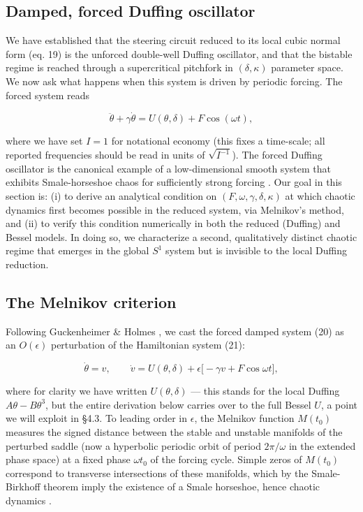 \documentclass[11pt]{article}
\begin{document}
\subsection{Damped, forced Duffing oscillator}

We have established that the steering circuit reduced to its local cubic normal form (eq. 19) is the unforced double-well Duffing oscillator, and that the bistable regime is reached through a supercritical pitchfork in $(\delta, \kappa)$ parameter space. We now ask what happens when this system is driven by periodic forcing. The forced system reads

\begin{equation}
\ddot\theta + \gamma\dot\theta = U(\theta, \delta) + F\cos(\omega t),
\end{equation}

where we have set $I = 1$ for notational economy (this fixes a time-scale; all reported frequencies should be read in units of $\sqrt{I^{-1}}$). The forced Duffing oscillator is the canonical example of a low-dimensional smooth system that exhibits Smale-horseshoe chaos for sufficiently strong forcing \cite{guckenheimer1983}. Our goal in this section is: (i) to derive an analytical condition on $(F, \omega, \gamma, \delta, \kappa)$ at which chaotic dynamics first becomes possible in the reduced system, via Melnikov's method, and (ii) to verify this condition numerically in both the reduced (Duffing) and Bessel models. In doing so, we characterize a second, qualitatively distinct chaotic regime that emerges in the global $S^1$ system but is invisible to the local Duffing reduction.

\subsection{The Melnikov criterion}

Following Guckenheimer \& Holmes \cite[§4.5]{guckenheimer1983}, we cast the forced damped system (20) as an $O(\epsilon)$ perturbation of the Hamiltonian system (21):

\begin{equation}
\dot\theta = v, \qquad \dot v = U(\theta, \delta) + \epsilon\bigl[-\gamma v + F\cos\omega t\bigr],
\end{equation}

where for clarity we have written $U(\theta, \delta)$ --- this stands for the local Duffing $A\theta - B\theta^3$, but the entire derivation below carries over to the full Bessel $U$, a point we will exploit in §4.3. To leading order in $\epsilon$, the Melnikov function $M(t_0)$ measures the signed distance between the stable and unstable manifolds of the perturbed saddle (now a hyperbolic periodic orbit of period $2\pi/\omega$ in the extended phase space) at a fixed phase $\omega t_0$ of the forcing cycle. Simple zeros of $M(t_0)$ correspond to transverse intersections of these manifolds, which by the Smale-Birkhoff theorem imply the existence of a Smale horseshoe, hence chaotic dynamics \cite[Theorem 4.5.3]{guckenheimer1983}.
\end{document}
